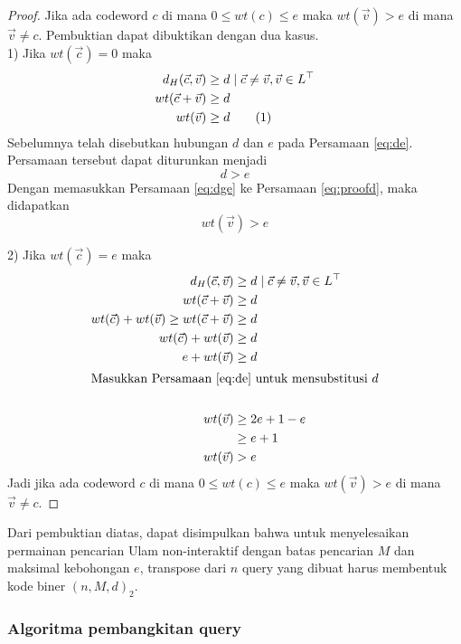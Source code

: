 \begin{proof}
Jika ada codeword $c$ di mana $0 \le wt(c) \le e$ maka $wt(\vec{v}) > e$ di mana $\vec{v} \neq c$. Pembuktian dapat dibuktikan dengan dua kasus.\\

1) Jika $wt(\vec{c}) = 0$ maka
\begin{align*}
d_H(\vec{c},\vec{v}) &\ge d \mid \vec{c} \neq \vec{v} , \vec{v} \in L^\top \\
wt(\vec{c} + \vec{v}) &\ge d \\
wt(\vec{v}) &\ge d \label{eq:proofd} \stepcounter{equation} \tag{\theequation}
\end{align*}
Sebelumnya telah disebutkan hubungan $d$ dan $e$ pada Persamaan \ref{eq:de}. Persamaan tersebut dapat diturunkan menjadi
\begin{equation} \label{eq:dge}
d > e
\end{equation}
Dengan memasukkan Persamaan \ref{eq:dge} ke Persamaan \ref{eq:proofd}, maka didapatkan
\begin{equation*}
wt(\vec{v}) > e
\end{equation*}

2) Jika $wt(\vec{c}) = e$ maka
\begin{align*}
d_H(\vec{c},\vec{v}) &\ge d \mid \vec{c} \neq \vec{v} , \vec{v} \in L^\top \\
wt(\vec{c}+\vec{v}) &\ge d \\
wt(\vec{c}) + wt(\vec{v}) \ge wt(\vec{c}+\vec{v}) &\ge d \\
wt(\vec{c}) + wt(\vec{v}) &\ge d \\
e + wt(\vec{v}) &\ge d \\
\intertext{Masukkan Persamaan \ref{eq:de} untuk mensubstitusi $d$}\\
wt(\vec{v}) &\ge 2e+1-e \\
&\ge e+1\\
wt(\vec{v}) &> e
\end{align*}
Jadi jika ada codeword $c$ di mana $0 \le wt(c) \le e$ maka $wt(\vec{v}) > e$ di mana $\vec{v} \neq c$.
\end{proof}

Dari pembuktian diatas, dapat disimpulkan bahwa untuk menyelesaikan permainan pencarian Ulam non-interaktif dengan batas pencarian $M$ dan maksimal kebohongan $e$, transpose dari $n$ query yang dibuat harus membentuk kode biner $(n,M,d)_2$.

\subsubsection{Algoritma pembangkitan query}

